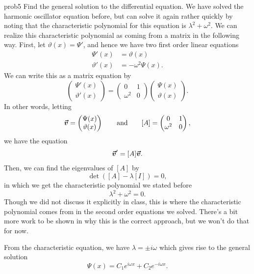 \documentclass{article}
\begin{document}
\begin{solution}{}{prob5}
		Find the general solution to the differential equation.
		\tcblower
		We have solved the harmonic oscillator equation before, but can solve it again rather quickly by noting that the characteristic polynomial for this equation is $\lambda^2+\omega^2$. We can realize this characteristic polynomial as coming from a matrix in the following way.  First, let $\vartheta(x)=\Psi'$, and hence we have two first order linear equations
		\begin{align*}
			\Psi'(x)&=\vartheta(x)\\
			\vartheta'(x)&=-\omega^2 \Psi(x).
		\end{align*}
		We can write this as a matrix equation by
		\[
		\begin{pmatrix} \Psi'(x) \\ \vartheta'(x) \end{pmatrix} = \begin{pmatrix} 0 & 1 \\ \omega^2 & 0 \end{pmatrix} \begin{pmatrix} \Psi(x) \\ \vartheta(x)\end{pmatrix}.
		\]
		In other words, letting
		\[
		\boldsymbol{\vec{v}}=\begin{pmatrix} \Psi(x) \\ \vartheta(x) \end{pmatrix} \qquad \textrm{and} \qquad [A]=\begin{pmatrix} 0 & 1 \\ \omega^2 & 0 \end{pmatrix},
		\]
		we have the equation
		\[
		\boldsymbol{\vec{v}}' = [A]\boldsymbol{\vec{v}}.
		\]
		Then, we can find the eigenvalues of $[A]$ by
		\[
		\det([A]-\lambda[I])=0,
		\]
		in which we get the characteristic polynomial we stated before
		\[
		\lambda^2+\omega^2=0.
		\]
		Though we did not discuss it explicitly in class, this is where the characteristic polynomial comes from in the second order equations we solved.  There's a bit more work to be shown in why this is the correct approach, but we won't do that for now.
		
		From the characteristic equation, we have $\lambda=\pm i\omega$ which gives rise to the general solution
		\[
		\boxed{\Psi(x)=C_1 e^{i\omega x}+C_2 e^{-i\omega x}}.
		\]
	\end{solution}
\end{document}
